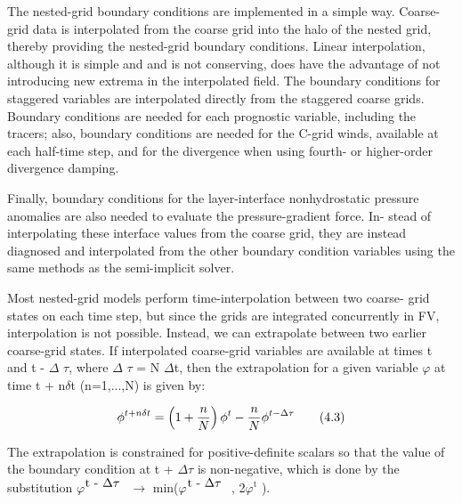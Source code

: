 The nested-\/grid boundary conditions are implemented in a simple way. Coarse-\/grid data is interpolated from the coarse grid into the halo of the nested grid, thereby providing the nested-\/grid boundary conditions. Linear interpolation, although it is simple and and is not conserving, does have the advantage of not introducing new extrema in the interpolated field. The boundary conditions for staggered variables are interpolated directly from the staggered coarse grids. Boundary conditions are needed for each prognostic variable, including the tracers; also, boundary conditions are needed for the C-\/grid winds, available at each half-\/time step, and for the divergence when using fourth-\/ or higher-\/order divergence damping.

Finally, boundary conditions for the layer-\/interface nonhydrostatic pressure anomalies are also needed to evaluate the pressure-\/gradient force. In-\/ stead of interpolating these interface values from the coarse grid, they are instead diagnosed and interpolated from the other boundary condition variables using the same methods as the semi-\/implicit solver.

Most nested-\/grid models perform time-\/interpolation between two coarse-\/ grid states on each time step, but since the grids are integrated concurrently in F\-V, interpolation is not possible. Instead, we can extrapolate between two earlier coarse-\/grid states. If interpolated coarse-\/grid variables are available at times t and t -\/ {$\Delta$} {$\tau$}, where {$\Delta$} {$\tau$} = N {$\Delta$}t, then the extrapolation for a given variable {$\varphi$} at time t + n{$\delta$}t (n=1,...,N) is given by\-:

\[ \phi^{t+n\delta t} = \left( 1 + \frac{n}{N} \right) \phi^t - \frac{n}{N} \phi^{t-\Delta \tau} \\ \tag {4.3} \]

The extrapolation is constrained for positive-\/definite scalars so that the value of the boundary condition at t + {$\Delta$}{$\tau$} is non-\/negative, which is done by the substitution {$\varphi$}$^{\mbox{t -\/ {$\Delta$}{$\tau$} }}$  {$\rightarrow$} min({$\varphi$}$^{\mbox{t -\/ {$\Delta$}{$\tau$} }}$ , 2{$\varphi$}$^{\mbox{t}}$  ).

